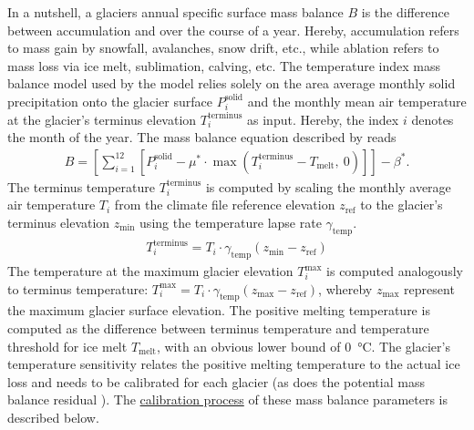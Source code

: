         In a nutshell, a glaciers annual specific surface mass balance $B$ is the difference between accumulation and over the course of a year. Hereby, accumulation refers to mass gain by snowfall, avalanches, snow drift, etc., while ablation refers to mass loss via ice melt, sublimation, calving, etc. The temperature index mass balance model used by the \vas{} model relies solely on the area average monthly solid precipitation onto the glacier surface $P_i^\text{solid}$ and the monthly mean air temperature at the glacier's terminus elevation $T_i^\text{terminus}$ as input. Hereby, the index $i$ denotes the month of the year. The mass balance equation described by \citet{Marzeion2012b} reads
        \begin{align}
            \label{eq:mass-balance}
            B = \left[\sum_{i=1}^{12}\left[
                    P_i^\text{solid}  - \mu^* \cdot \max\left(T_{i}^\text{terminus} - T_\text{melt},\ 0\right)
                \right]\right] - \beta^*.
        \end{align}
        The terminus temperature $T_{i}^\text{terminus}$ is computed by scaling the monthly average air temperature $T_i$ from the climate file reference elevation $z_\text{ref}$ to the glacier's terminus elevation $z_\text{min}$ using the temperature lapse rate $\gamma_\text{temp}$.
        \begin{align}
            T_i^\text{terminus} = T_i \cdot \gamma_\text{temp} (z_\text{min} - z_\text{ref})
        \end{align}
        The temperature at the maximum glacier elevation $T_{i}^\text{max}$ is computed analogously to terminus temperature: $T_{i}^\text{max} = T_i \cdot \gamma_\text{temp} (z_\text{max} - z_\text{ref})$, whereby $z_\text{max}$ represent the maximum glacier surface elevation. The positive melting temperature is computed as the difference between terminus temperature and temperature threshold for ice melt $T_\text{melt}$, with an obvious lower bound of \SI{0}{\celsius}. The glacier's temperature sensitivity \mustar{} relates the positive melting temperature to the actual ice loss and needs to be calibrated for each glacier (as does the potential mass balance residual \bias{}). The \hyperref[ssub:mb_calib]{calibration process} of these mass balance parameters is described below.
        
